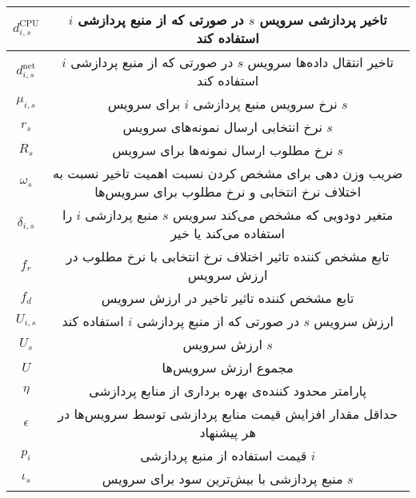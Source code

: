 \begin{table}[h]
\begin{tabularx}{\textwidth}{|c|C|}
        $d_{i,s}^\text{CPU}$ & تاخیر پردازشی سرویس $s$ در صورتی که از منبع پردازشی $i$ استفاده کند                       \\ \hline
        $d_{i,s}^\text{net}$ & تاخیر انتقال داده‌ها سرویس $s$  در صورتی که از منبع پردازشی $i$ استفاده کند                \\ \hline
        $\mu_{i,s}$         & نرخ سرویس منبع پردازشی $i$ برای سرویس $s$                                                  \\ \hline
        $r_s$               & نرخ انتخابی ارسال نمونه‌های سرویس $s$                                                       \\ \hline
        $R_s$               & نرخ مطلوب ارسال نمونه‌ها برای سرویس $s$                                                     \\ \hline
        $\omega_s$          & ضریب وزن دهی برای مشخص کردن نسبت اهمیت تاخیر نسبت به اختلاف نرخ انتخابی و نرخ مطلوب برای سرویس‌ها \\ \hline
        $\delta_{i,s}$      & متغیر دودویی که مشخص می‌کند سرویس $s$ منبع پردازشی $i$ را استفاده می‌کند یا خیر              \\ \hline
        $f_r$               & تابع مشخص کننده تاثیر اختلاف نرخ انتخابی با نرخ مطلوب در ارزش سرویس                         \\ \hline
        $f_d$               & تابع مشخص کننده تاثیر تاخیر در ارزش سرویس                                                  \\ \hline
        $U_{i,s}$           & ارزش سرویس $s$ در صورتی که از منبع پردازشی $i$ استفاده کند                                 \\ \hline
        $U_s$               & ارزش سرویس $s$                                                                             \\ \hline
        $U$                 & مجموع ارزش سرویس‌ها                                                                         \\ \hline
        $\eta$              & پارامتر محدود کننده‌ی بهره برداری از منابع پردازشی                                          \\ \hline
        $\epsilon$          & حداقل مقدار افزایش قیمت منابع پردازشی توسط سرویس‌ها در هر پیشنهاد                           \\ \hline
        $p_i$               & قیمت استفاده از منبع پردازشی $i$                                                           \\ \hline
        $\iota_s$           & منبع پردازشی با بیش‌ترین سود برای سرویس $s$                                                 \\ \hline

\end{tabularx}
\end{table}
